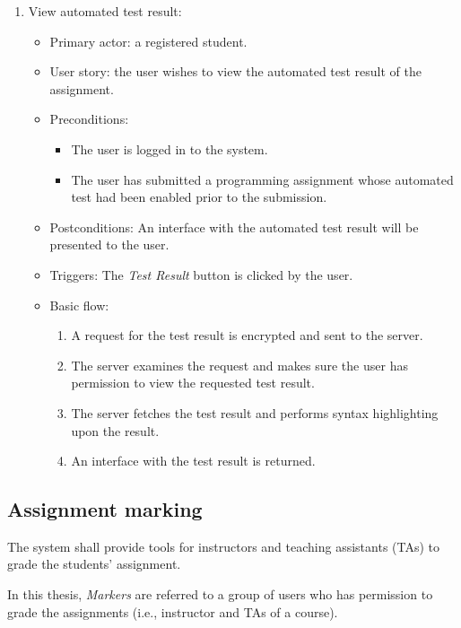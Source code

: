 \begin{enumerate}
\item View automated test result:
\begin{itemize}
    \item Primary actor: a registered student.
    \item User story: the user wishes to view the automated test result of the
        assignment.
    \item Preconditions:
        \begin{itemize}
            \item The user is logged in to the system.
            \item The user has submitted a programming assignment whose
                automated test had been enabled prior to the submission.
        \end{itemize}
    \item Postconditions:
        An interface with the automated test result will be presented to the
        user.
    \item Triggers: 
        The \emph{Test Result} button is clicked by the user.
    \item Basic flow:
        \begin{enumerate}
            \item A request for the test result is encrypted and sent to the
                server.
            \item The server examines the request and makes sure the user has
                permission to view the requested test result.
            \item The server fetches the test result and performs syntax
                highlighting upon the result.
            \item An interface with the test result is returned.
        \end{enumerate}
\end{itemize}
\end{enumerate}

\subsection{Assignment marking}
The system shall provide tools for instructors and teaching assistants (TAs) to
grade the students' assignment.

In this thesis, \emph{Markers} are referred to a group of users who has
permission to grade the assignments (i.e., instructor and TAs of a course).

